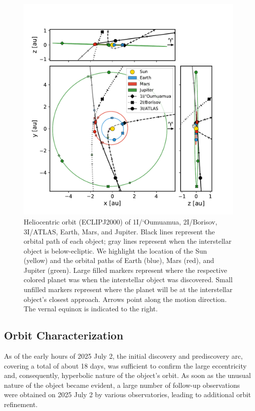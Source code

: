\documentclass[linenumbers,twocolumn,longbib]{aastex7}
\begin{document}
\begin{figure}
    \centering
    \includegraphics[width=1.\linewidth, trim=3.5mm 3mm 4mm 3mm, clip]{static/orbit_1I_2I_3I.pdf}
    \caption{Heliocentric orbit (ECLIPJ2000) of 1I/`Oumuamua, 2I/Borisov, 3I/ATLAS, Earth, Mars, and Jupiter. Black lines represent the orbital path of each object; gray lines represent when the interstellar object is below-ecliptic. We highlight the location of the Sun (yellow) and the orbital paths of Earth (blue), Mars (red), and Jupiter (green). Large filled markers represent where the respective colored planet was when the interstellar object was discovered. Small unfilled markers represent where the planet will be at the interstellar object's closest approach. Arrows point along the motion direction. The vernal equinox is indicated to the right.}
    \label{fig:orbit}
\end{figure}

\subsection{Orbit Characterization}

As of the early hours of 2025 July 2, the initial discovery and prediscovery arc, covering a total of about 18 days, was sufficient to confirm the large eccentricity and, consequently, hyperbolic nature of the object's orbit. As soon as the unusual nature of the object became evident, a large number of follow-up observations were obtained on 2025 July 2 by various observatories, leading to additional orbit refinement.
\end{document}
